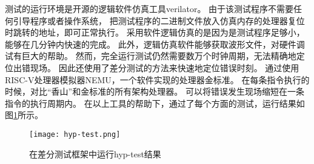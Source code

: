 测试的运行环境是开源的逻辑软件仿真工具verilator。
由于该测试程序不需要任何引导程序或者操作系统，
把测试程序的二进制文件放入仿真内存的处理器复位时跳转的地址，即可正常执行。
采用软件逻辑仿真的是因为是测试程序足够小，能够在几分钟内快速的完成。
此外，逻辑仿真软件能够获取波形文件，对硬件调试有巨大的帮助。
然而，完全运行测试仍然需要数万个时钟周期，无法精确地定位出错现场。
因此还使用了差分测试的方法来快速地定位错误时刻。
通过使用RISC-V处理器模拟器NEMU，一个软件实现的处理器金标准。
在每条指令执行的时候，对比“香山”和金标准的所有架构处理器。
可以将错误发生现场缩短在一条指令的执行周期内。
在以上工具的帮助下，通过了每个方面的测试，运行结果如图\ref{fig:hyp-test}所示。

\begin{figure}[htbp]
    \centering
    \texttt{[image: hyp-test.png]}
    \caption{在差分测试框架中运行hyp-test结果}
    \label{fig:hyp-test}
\end{figure}